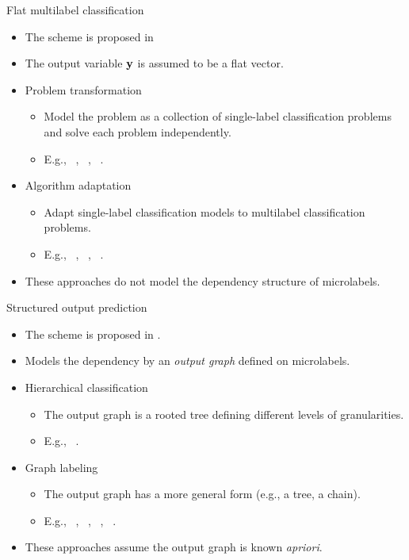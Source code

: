 \documentclass[first=dgreen,second=purple,logo=yellowexc]{aaltoslides}
\begin{document}
%
\begin{frame}{Flat multilabel classification}
	\begin{itemize}\footnotesize
		\item The scheme is proposed in \cite{Tsoumakas10mining}
		\item The output variable $\mathbf {y}$ is assumed to be a flat vector.
		\item Problem transformation
		\begin{itemize}\footnotesize
			\item Model the problem as a collection of single-label classification problems and solve each problem independently.
			\item E.g., \mlknn\ \cite{Zhang07mlknn}, \cc\ \cite{Read11classifier}, \iblr\ \cite{Cheng09combining}.
		\end{itemize}
		\item Algorithm adaptation 
		\begin{itemize}\footnotesize
			\item Adapt single-label classification models to multilabel classification problems.
			\item E.g., \corrlog\ \cite{Bian12corrlog}, \mtl\ \cite{Argyriou08convex}, \adaboostmh\ \cite{Schapire99improved,Esuli2008boosting}.
		\end{itemize}
		\item These approaches do not model the dependency structure of microlabels.
	\end{itemize}
\end{frame}

%
\begin{frame}{Structured output prediction}
	\begin{itemize}\footnotesize
		\item The scheme is proposed in \cite{Su2014Multilabel}.
		\item Models the dependency by an {\em output graph} defined on microlabels.
		\item Hierarchical classification
		\begin{itemize}\footnotesize
			\item The output graph is a rooted tree defining different levels of granularities.
			\item E.g., \svmstruct\ \cite{THJA04,TJTA05}.
		\end{itemize}
		\item Graph labeling
		\begin{itemize}\footnotesize
			\item The output graph has a more general form (e.g., a tree, a chain).
			\item E.g., \crf\ \cite{lafferty01,taskar02}, \mmmn\ \cite{Taskar04max}, \mmcrf\ \cite{Rousu07, su10structured}, \spin\ \cite{su14structured}.
		\end{itemize}
		\item These approaches assume the output graph is known {\em apriori}.
	\end{itemize}
\end{frame}
\end{document}
